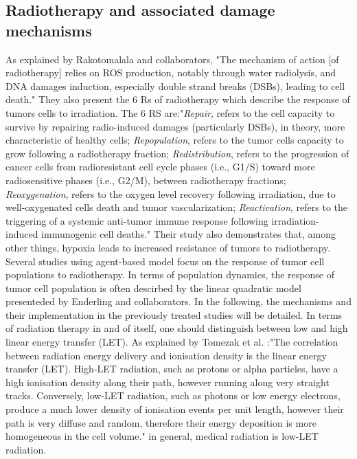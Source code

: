 \documentclass[11pt,a4paper]{article}
\begin{document}
\subsection{Radiotherapy and associated damage mechanisms}
As explained by Rakotomalala and collaborators,\cite{Rakotomalala2021} "The mechanism of action [of radiotherapy] relies on ROS production, notably through water radiolysis, and DNA damages induction, especially double strand breaks (DSBs), leading to cell death." They also present the 6 Rs of radiotherapy which describe the response of tumors cells to irradiation. The 6 RS are:"\textit{Repair}, refers to the cell capacity to survive by repairing radio-induced damages (particularly DSBs), in theory, more characteristic of healthy cells; \textit{Repopulation}, refers to the tumor cells capacity to grow following a radiotherapy fraction; \textit{Redistribution}, refers to the progression of cancer cells from radioresistant cell cycle phases (i.e., G1/S) toward more radiosensitive phases (i.e., G2/M), between radiotherapy fractions; \textit{Reoxygenation}, refers to the oxygen level recovery following irradiation, due to well-oxygenated cells death and tumor vascularization; \textit{Reactivation}, refers to the triggering of a systemic anti-tumor immune response following irradiation-induced immunogenic cell deaths." Their study also demonstrates that, among other things, hypoxia leads to increased resistance of tumors to radiotherapy. Several studies using agent-based model focus on the response of tumor cell populations to radiotherapy. In terms of population dynamics, the response of tumor cell population is often descirbed by the linear quadratic model presenteded by Enderling and collaborators.\cite{Enderling2010} In the following, the mechanisms and their implementation in the previously treated studies will be detailed.
In terms of radiation therapy in and of itself, one should distinguish between low and high linear energy transfer (LET). As explained  by Tomezak et al. :"The correlation between radiation energy delivery and ionisation density is the linear energy transfer (LET). High-LET radiation, such as protons or alpha particles, have a high ionisation density along their path, however running along very straight tracks. Conversely, low-LET radiation, such as photons or low energy electrons, produce a much lower density of ionisation events per unit length, however their path is very diffuse and random, therefore their energy deposition is more homogeneous in the cell volume." \cite{Tomezak2015} in general, medical radiation is low-LET radiation.
\end{document}
